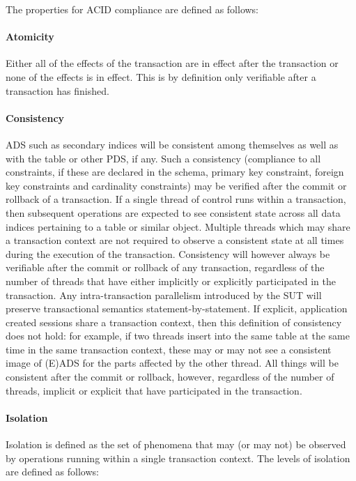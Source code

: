 The properties for ACID compliance are defined as follows:

\paragraph{Atomicity}
Either all of the effects of the transaction are in effect after the transaction or none of the effects
is in effect. This is by definition only verifiable after a transaction has finished.

\paragraph{Consistency}
ADS such as secondary indices will be consistent among themselves as well as with the table or other PDS, if any. Such a consistency (compliance to all constraints, if these are declared in the schema, \eg primary key constraint, foreign key constraints and cardinality constraints) may be verified
after the commit or rollback of a transaction. If a single thread of control runs within a transaction, then
subsequent operations are expected to see consistent state across all data indices pertaining to a table
or similar object. Multiple threads which may share a transaction context are not required to observe a
consistent state at all times during the execution of the transaction. Consistency will however always be
verifiable after the commit or rollback of any transaction, regardless of the number of threads that have
either implicitly or explicitly participated in the transaction. Any intra-transaction parallelism introduced
by the SUT will preserve transactional semantics statement-by-statement. If explicit, application created
sessions share a transaction context, then this definition of consistency does not hold: for example, if
two threads insert into the same table at the same time in the same transaction context, these may or may
not see a consistent image of (E)ADS for the parts affected by the other thread. All things will be
consistent after the commit or rollback, however, regardless of the number of threads, implicit or explicit
that have participated in the transaction.

\paragraph{Isolation}
Isolation is defined as the set of phenomena that may (or may not) be observed by operations running within a single transaction context. The levels of isolation are defined as follows:

